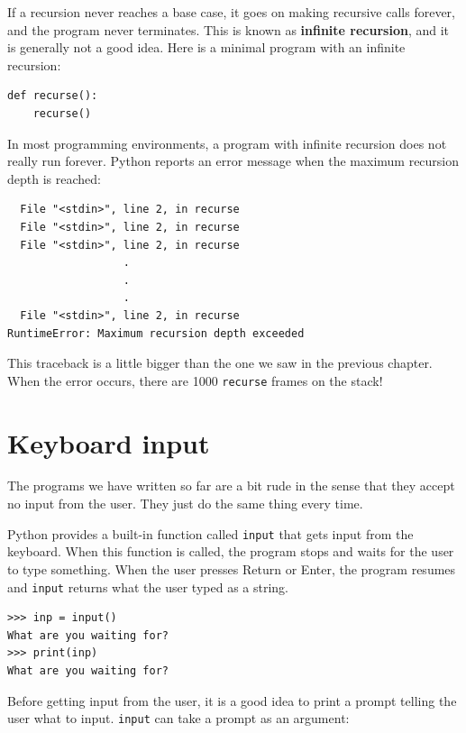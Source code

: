\documentclass[10pt]{book}
\begin{document}
If a recursion never reaches a base case, it goes on making
recursive calls forever, and the program never terminates.  This is
known as {\bf infinite recursion}, and it is generally not
a good idea.  Here is a minimal program with an infinite recursion:

\beforeverb
\begin{verbatim}
def recurse():
    recurse()
\end{verbatim}
\afterverb
%
In most programming environments, a program with infinite recursion
does not really run forever.  Python reports an error
message when the maximum recursion depth is reached:


\beforeverb
\begin{verbatim}
  File "<stdin>", line 2, in recurse
  File "<stdin>", line 2, in recurse
  File "<stdin>", line 2, in recurse
                  .   
                  .
                  .
  File "<stdin>", line 2, in recurse
RuntimeError: Maximum recursion depth exceeded
\end{verbatim}
\afterverb
%
This traceback is a little bigger than the one we saw in the
previous chapter.  When the error occurs, there are 1000
{\tt recurse} frames on the stack!

\section{Keyboard input}

The programs we have written so far are a bit rude in the sense that
they accept no input from the user.  They just do the same thing every
time.

Python provides a built-in function called \verb"input" that gets
input from the keyboard.  When this function is called, the program stops and
waits for the user to type something.  When the user presses {\sf
  Return} or {\sf Enter}, the program resumes and \verb"input"
returns what the user typed as a string.


\beforeverb
\begin{verbatim}
>>> inp = input()
What are you waiting for?
>>> print(inp)
What are you waiting for?
\end{verbatim}
\afterverb
%
Before getting input from the user, it is a good idea to print a
prompt telling the user what to input.  \verb"input" can take a
prompt as an argument:
\end{document}
